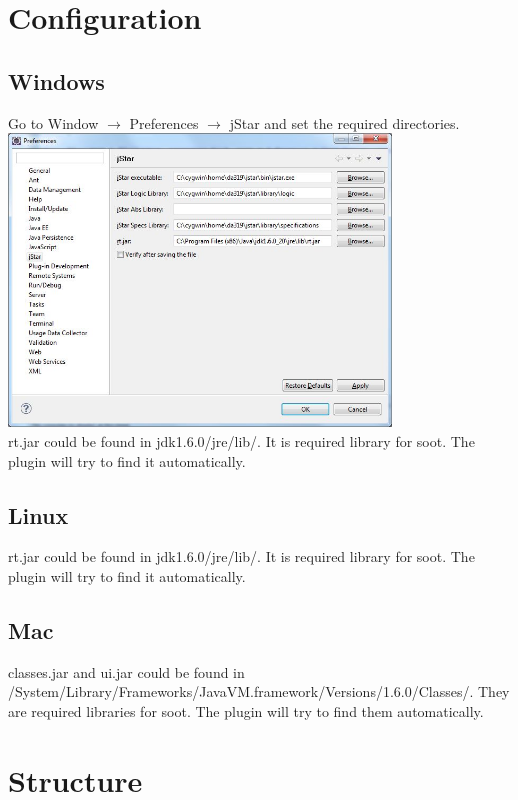 \documentclass{article}
\begin{document}
\section{Configuration}

\subsection{Windows}

Go to Window $\rightarrow$ Preferences $\rightarrow$ jStar and set the required directories.\\

\includegraphics[width=4in]{images/preferences.jpg}\\

rt.jar could be found in jdk1.6.0/jre/lib/. It is required library for soot. The plugin will try to find it automatically. 

\subsection{Linux}
rt.jar could be found in jdk1.6.0/jre/lib/. It is required library for soot. The plugin will try to find it automatically. 

\subsection{Mac}
classes.jar and ui.jar could be found in \\ /System/Library/Frameworks/JavaVM.framework/Versions/1.6.0/Classes/.  They are required libraries for soot. The plugin will try to find them automatically. 

\section {Structure}
\end{document}
